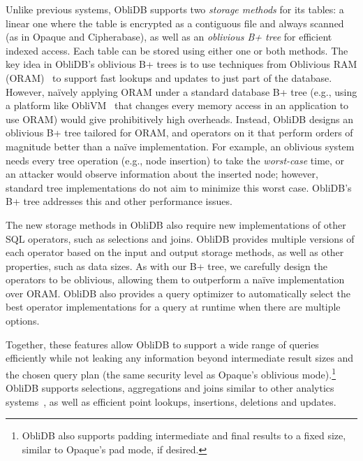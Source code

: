 \documentclass[letterpaper,twocolumn,10pt]{article}
\def\name/{ObliDB}
\begin{document}
Unlike previous systems, \name/ supports two \emph{storage methods} for its tables: a linear one where the table is encrypted as a contiguous file and always scanned (as in Opaque and Cipherabase), as well as an \emph{oblivious B+ tree} for efficient indexed access.
Each table can be stored using either one or both methods.
The key idea in \name/'s oblivious B+ trees is to use techniques from Oblivious RAM (ORAM)~\cite{SDS+13} to support fast lookups and updates to just part of the database.
However, na\"ively applying ORAM under a standard database B+ tree (e.g., using a platform like ObliVM~\cite{oblivm} that changes every memory access in an application to use ORAM) would give prohibitively high overheads.
Instead, \name/ designs an oblivious B+ tree tailored for ORAM, and operators on it that perform orders of magnitude better than a na\"ive implementation.
For example, an oblivious system needs every tree operation (e.g., node insertion) to take the \emph{worst-case} time, or an attacker would observe information about the inserted node; however, standard tree implementations do not aim to minimize this worst case.
\name/'s B+ tree addresses this and other performance issues.

The new storage methods in \name/ also require new implementations of other SQL operators, such as selections and joins.
\name/ provides multiple versions of each operator based on the input and output storage methods, as well as other properties, such as data sizes.
As with our B+ tree, we carefully design the operators to be oblivious, allowing them to outperform a na\"ive implementation over ORAM.
\name/ also provides a query optimizer to automatically select the best operator implementations for a query at runtime when there are multiple options.

Together, these features allow \name/ to support a wide range of queries efficiently while not leaking any information beyond intermediate result sizes and the chosen query plan (the same security level as Opaque's oblivious mode).\footnote{
    \name/ also supports padding intermediate and final results to a fixed size, similar to Opaque's pad mode, if desired.
}
\name/ supports selections, aggregations and joins similar to other analytics systems~\cite{ZDB+17,cipherbase}, as well as efficient point lookups, insertions, deletions and updates.
\end{document}
